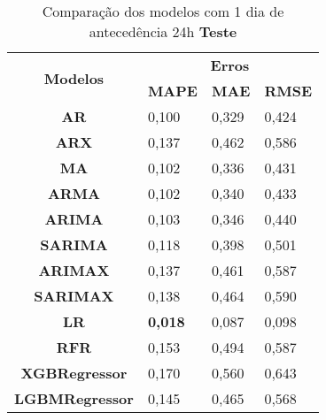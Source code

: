 \begin{table}[H]
	\centering
	\caption{Comparação dos modelos com 1 dia de antecedência 24h \textbf{Teste} }\label{tb:1-24tst}
	\begin{tabular}{@{}clll@{}}
		\toprule
		\multirow{2}{*}{\textbf{Modelos}} & \multicolumn{3}{c}{\textbf{Erros}}                                                                       \\ \cmidrule(l){2-4} 
		& \multicolumn{1}{c}{\textbf{MAPE}} & \multicolumn{1}{c}{\textbf{MAE}} & \multicolumn{1}{c}{\textbf{RMSE}} \\ \hline
\textbf{AR}                       & 0,100                             & 0,329                            & 0,424                             \\
\textbf{ARX}                      & 0,137                             & 0,462                            & 0,586                             \\
\textbf{MA}                       & 0,102                             & 0,336                            & 0,431                             \\
\textbf{ARMA}                     & 0,102                             & 0,340                            & 0,433                             \\
\textbf{ARIMA}                    & 0,103                             & 0,346                            & 0,440                             \\
\textbf{SARIMA}                   & 0,118                             & 0,398                            & 0,501                             \\
\textbf{ARIMAX}                   & 0,137                             & 0,461                            & 0,587                             \\
\textbf{SARIMAX}                  & 0,138                             & 0,464                            & 0,590                             \\
\textbf{LR}                       & \textbf{0,018}                             & 0,087                            & 0,098                             \\
\textbf{RFR}                      & 0,153                             & 0,494                            & 0,587                             \\
\textbf{XGBRegressor}             & 0,170                             & 0,560                            & 0,643                             \\
\textbf{LGBMRegressor}            & 0,145                             & 0,465                            & 0,568                             \\ \bottomrule
	\end{tabular}

\end{table}

